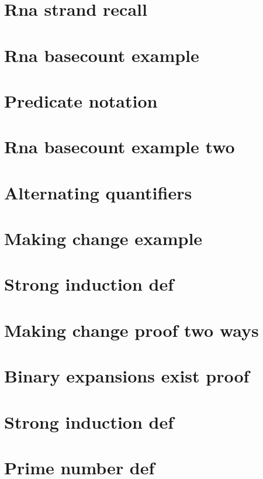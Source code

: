 \section*{Rna strand recall}

\vfill
\section*{Rna basecount example}

\vfill
\section*{Predicate notation}

\vfill
\section*{Rna basecount example two}

\vfill
\section*{Alternating quantifiers}

\vfill
\section*{Making change example}

\vfill
\section*{Strong induction def}

\vfill
\section*{Making change proof two ways}

\vfill
\section*{Binary expansions exist proof}

\vfill
\section*{Strong induction def}

\vfill
\section*{Prime number def}

\vfill
